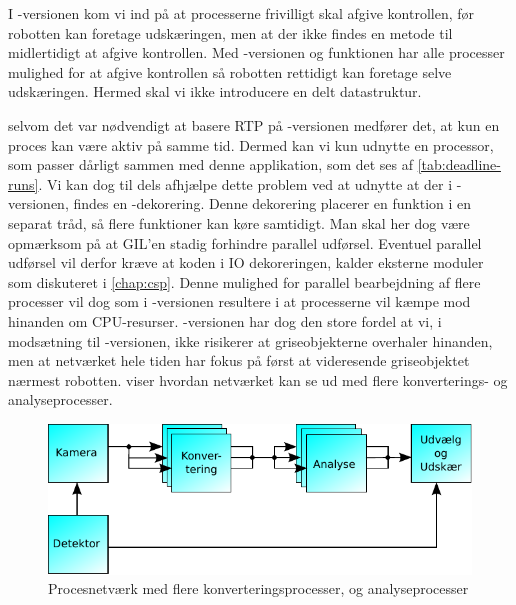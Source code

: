 I -versionen kom vi ind på at processerne frivilligt skal afgive kontrollen, før robotten kan foretage udskæringen, men at der ikke findes en metode til midlertidigt at afgive kontrollen. Med -versionen og funktionen  har alle processer mulighed for at afgive kontrollen så robotten rettidigt kan foretage selve udskæringen. Hermed skal vi ikke introducere en delt datastruktur.
  
selvom det var nødvendigt at basere RTP på  -versionen medfører det, at kun en proces kan være aktiv på samme tid. Dermed kan vi kun udnytte en processor, som  passer dårligt sammen med denne applikation, som det ses af \cref{tab:deadline-runs}.  Vi kan dog til dels afhjælpe dette problem ved at udnytte at der i -versionen, findes en -dekorering. Denne dekorering placerer en funktion i en separat tråd, så flere funktioner kan køre samtidigt. Man skal her dog være opmærksom på at GIL'en stadig forhindre parallel udførsel. Eventuel parallel udførsel vil derfor kræve at koden i IO dekoreringen, kalder eksterne moduler som diskuteret i \cref{chap:csp}. Denne mulighed for parallel bearbejdning af flere processer vil dog  som i -versionen resultere i at processerne vil kæmpe mod hinanden om CPU-resurser. -versionen har dog den store fordel at vi, i modsætning til -versionen, ikke risikerer at griseobjekterne overhaler hinanden, men at netværket hele tiden har fokus på først at videresende griseobjektet nærmest robotten.  viser hvordan netværket kan se ud med flere konverterings- og analyseprocesser.

\begin{figure}
 \begin{center}
  \includegraphics[scale=1]{images/pig-network3}
	\caption{Procesnetværk med flere konverteringsprocesser, og analyseprocesser}
	\label{fig:pig-network3}
\end{center}
\end{figure}


